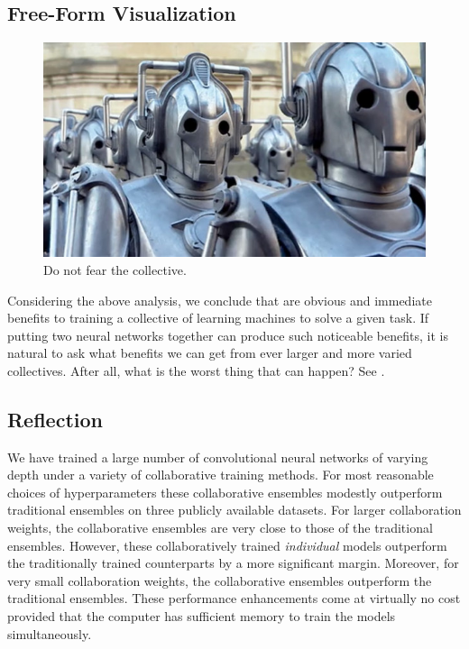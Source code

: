 \documentclass[english,a4paper,oneside]{amsart}
\theoremstyle{definition}
\begin{document}
\subsection{Free-Form Visualization}
\begin{figure}
	\begin{center} \includegraphics[scale=0.4]{images/cybermen.jpg}\end{center}
	\caption{Do not fear the collective.}\label{cybermen}
\end{figure}
Considering the above analysis, we conclude that are obvious and immediate benefits to training a collective of learning machines to solve a given task. If putting two neural networks together can produce such noticeable benefits, it is natural to ask what benefits we can get from ever larger and more varied collectives. After all, what is the worst thing that can happen? See .


\subsection{Reflection}
We have trained a large number of convolutional neural networks of varying depth under a variety of collaborative training methods. For most reasonable choices of hyperparameters these collaborative ensembles modestly outperform traditional ensembles on three publicly available datasets. For larger collaboration weights, the collaborative ensembles are very close to those of the traditional ensembles. However, these collaboratively trained \emph{individual} models outperform the traditionally trained counterparts by a more significant margin. Moreover, for very small collaboration weights, the collaborative ensembles outperform the traditional ensembles. These performance enhancements come at virtually no cost provided that the computer has sufficient memory to train the models simultaneously. 
\end{document}
